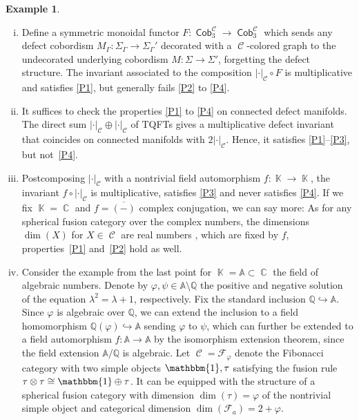 \documentclass[10pt,a4paper]{amsart}
\DeclareMathOperator{\K}{\mathbb{K}}
\DeclareMathOperator{\C}{\mathbb{C}}
\DeclareMathOperator{\Cob}{\mathsf{Cob}}
\DeclareMathOperator{\calc}{\mathcal{C}}
\numberwithin{equation}{section}
\theoremstyle{definition}
\newtheorem{Example}[Example]{Example}
\begin{document}
\begin{Example}
\begin{enumerate}[(i)]
 \item \label{itemExProp} Define a symmetric monoidal functor $F\colon \Cob_3^{\calc} \rightarrow \Cob_3^{\calc}$ which sends any defect cobordism $M_{\Gamma}\colon \Sigma_{\Gamma} \rightarrow \Sigma_{\Gamma}'$ decorated with a $\calc$-colored graph to the undecorated underlying cobordism $M\colon \Sigma \rightarrow \Sigma'$, forgetting the defect structure. The invariant associated to the composition $|\cdot|_{\calc} \circ F$ is multiplicative and satisfies \ref{P1}, but generally fails \ref{P2} to \ref{P4}.
 \item It suffices to check the properties \ref{P1} to \ref{P4} on connected defect manifolds. The direct sum $|\cdot|_{\calc} \oplus |\cdot|_{\calc}$ of TQFTs gives a multiplicative defect invariant that coincides on connected manifolds with $2|\cdot|_{\calc}$. Hence, it satisfies \ref{P1}--\ref{P3}, but not~\ref{P4}.
 \item Postcomposing $| \cdot |_{\calc}$ with a nontrivial field automorphism $f\colon \K \rightarrow \K$, the invariant $f \circ | \cdot |_{\calc}$ is multiplicative, satisfies \ref{P3} and never satisfies \ref{P4}. If we fix $\K = \C$ and $f = \overline{(-)}$ complex conjugation, we can say more: As for any spherical fusion category over the complex numbers, the dimensions $\dim(X)$ for $X \in \calc$ are real numbers \cite[Corollary~2.10]{ENO}, which are fixed by $f$, properties~\ref{P1} and~\ref{P2} hold as well.
 \item \label{itemAlg} Consider the example from the last point for $\K = \mathbb{A} \subset \C$ the field of algebraic numbers. Denote by $\varphi, \psi \in \mathbb{A}\setminus \mathbb{Q}$ the positive and negative solution of the equation $\lambda^2 = \lambda + 1$, respectively. Fix the standard inclusion $\mathbb{Q} \hookrightarrow \mathbb{A}$. Since $\varphi$ is algebraic over $\mathbb{Q}$, we can extend the inclusion to a field homomorphism $\mathbb{Q}(\varphi) \hookrightarrow \mathbb{A}$ sending $\varphi$ to $\psi$, which can further be extended to a field automorphism $f\colon \mathbb{A} \rightarrow \mathbb{A}$ by the isomorphism extension theorem, since the field extension $\mathbb{A}/\mathbb{Q}$ is algebraic. Let $\calc = \mathcal{F}_{\varphi}$ denote the Fibonacci category with two simple objects $\mathbbm{1}, \tau$ satisfying the fusion rule $\tau \otimes \tau \cong \mathbbm{1} \oplus \tau$. It can be equipped with the structure of a spherical fusion category with dimension $\dim(\tau) = \varphi$ of the nontrivial simple object and categorical dimension $\dim(\mathcal{F}_a) = 2 + \varphi$.


\end{enumerate}
\end{Example}
\end{document}
